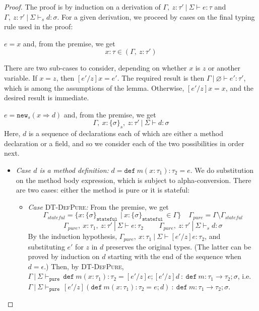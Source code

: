 \documentclass{llncs}
\newcommand{\keywadj}[1]{\mathtt{#1}}
\newcommand{\keyw}[1]{\keywadj{#1}~}
\newcommand{\pcase}[1][]{
  \if\relax\detokenize{#1}\relax
    \def\thiscase{}
  \else
    \def\thiscase{~#1}
  \fi
  \item
}
\begin{document}
\begin{proof} The proof is by induction on a derivation of $\Gamma,~z : \tau'~|~\Sigma \vdash e : \tau$ and $\Gamma,~z : \tau'~|~\Sigma \vdash_s d : \sigma$. For a given derivation, we proceed by cases on the final typing rule used in the proof:

\begin{pcases}
\pcase[\textsc{T-Var}]
$e = x$ and, from the premise, we get 
\[
x : \tau \in (\Gamma,~z : \tau')
\]

There are two sub-cases to consider, depending on whether $x$ is $z$ or another variable. If $x = z$, then $[e'/z]x = e'$. The required result is then $\Gamma~|~\varnothing \vdash e' : \tau'$, which is among the assumptions of the lemma. Otherwise, $[e'/z]x = x$, and the desired result is immediate.
\\
\pcase[\textsc{T-New}]
$e = \keywadj{new}_{s}(x \Rightarrow d)$ and, from the premise, we get
\[
\Gamma,~x : \{ \sigma \}_{s},~z : \tau'~|~\Sigma \vdash d : \sigma
\]
Here, $d$ is a sequence of declarations each of which are either a method declaration or a field, and so we consider each of the two possibilities in order next.
\\
\begin{itemize}
\item[] \textit{Case $d$ is a method definition:} $d = \keyw{def} m(x : \tau_1) : \tau_2 = e$. We do substitution on the method body expression, which is subject to alpha-conversion. There are two cases: either the method is pure or it is stateful:
\\
\begin{itemize}
\item[] \textit{Case} \textsc{DT-DefPure}\textit{:} From the premise, we get
\[
\Gamma_{stateful} = \{x : \{ \sigma \}_{\keyw{stateful}} ~|~ x : \{ \sigma \}_{\keyw{stateful}} \in \Gamma\}~~~~~\Gamma_{pure} = \Gamma \setminus \Gamma_{stateful}
\]\[
\Gamma_{pure},~x : \tau_1,~z : \tau'~|~\Sigma \vdash e : \tau_2~~~~~~~~~~\Gamma_{pure},~z : \tau'~|~\Sigma \vdash_s d : \sigma
\]
By the induction hypothesis, $\Gamma_{pure},~x : \tau_1~|~\Sigma \vdash [e'/z]e : \tau_2$, and substituting $e'$ for $z$ in $d$ preserves the original types. (The latter can be proved by induction on $d$ starting with the end of the sequence when $d = \epsilon$.) Then, by \textsc{DT-DefPure}, $\Gamma~|~\Sigma \vdash_{\keyw{pure}} \keyw{def} m(x : \tau_1) : \tau_2 = [e'/z]e; [e'/z]d~:~\keyw{def} m : \tau_1 \rightarrow \tau_2; \sigma$, i.e. $\Gamma~|~\Sigma \vdash_{\keyw{pure}} [e'/z](\keyw{def} m(x : \tau_1) : \tau_2 = e; d)~:~\keyw{def} m : \tau_1 \rightarrow \tau_2; \sigma$.

\end{itemize}
\end{itemize}
\end{pcases}
\end{proof}
\end{document}
